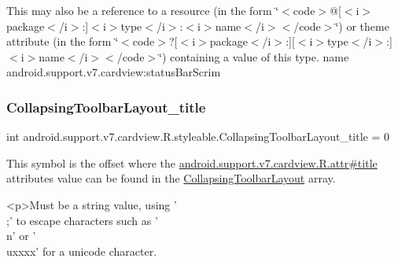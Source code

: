 This may also be a reference to a resource (in the form \char`\"{}$<$code$>$@\mbox{[}$<$i$>$package$<$/i$>$\+:\mbox{]}$<$i$>$type$<$/i$>$\+:$<$i$>$name$<$/i$>$$<$/code$>$\char`\"{}) or theme attribute (in the form \char`\"{}$<$code$>$?\mbox{[}$<$i$>$package$<$/i$>$\+:\mbox{]}\mbox{[}$<$i$>$type$<$/i$>$\+:\mbox{]}$<$i$>$name$<$/i$>$$<$/code$>$\char`\"{}) containing a value of this type.  name android.\+support.\+v7.\+cardview\+:status\+Bar\+Scrim \mbox{\label{classandroid_1_1support_1_1v7_1_1cardview_1_1R_1_1styleable_a7bb1d248c841d16154184e1f8bbc0581}} 
\subsubsection{\texorpdfstring{Collapsing\+Toolbar\+Layout\+\_\+title}{CollapsingToolbarLayout\_title}}
{\footnotesize\ttfamily int android.\+support.\+v7.\+cardview.\+R.\+styleable.\+Collapsing\+Toolbar\+Layout\+\_\+title = 0\hspace{0.3cm}{\ttfamily [static]}}

This symbol is the offset where the \hyperlink{classandroid_1_1support_1_1v7_1_1cardview_1_1R_1_1attr_a152f347649775e5aee3805c09dbbab39}{android.\+support.\+v7.\+cardview.\+R.\+attr\#title} attribute\textquotesingle{}s value can be found in the \hyperlink{classandroid_1_1support_1_1v7_1_1cardview_1_1R_1_1styleable_a3b4c5393d0c99cb4e5a7a3911fc606b4}{Collapsing\+Toolbar\+Layout} array.

\begin{DoxyVerb}      <p>Must be a string value, using '\\;' to escape characters such as '\\n' or '\\uxxxx' for a unicode character.
\end{DoxyVerb}
 

